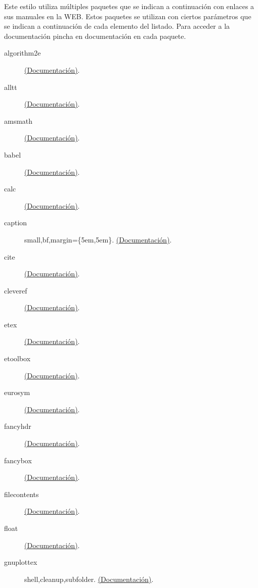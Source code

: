 Este estilo utiliza múltiples paquetes que se indican a continuación con enlaces a sus manuales en la WEB. Estos paquetes se utilizan con ciertos parámetros que se indican a continuación de cada elemento del listado. Para acceder a la documentación pincha en documentación en cada paquete.

\begin{description}
\item [algorithm2e] \href{http://osl.ugr.es/CTAN/macros/latex/contrib/algorithm2e/doc/algorithm2e.pdf}{(Documentación)}.
\item [alltt] \href{http://osl.ugr.es/CTAN/macros/latex/base/alltt.pdf}{(Documentación)}.
\item [amsmath] \href{http://osl.ugr.es/CTAN/macros/latex/required/amsmath/amsmath.pdf}{(Documentación)}.
\item [babel] \href{http://osl.ugr.es/CTAN/macros/latex/required/babel/base/babel.pdf}{(Documentación)}.
\item [calc] \href{http://osl.ugr.es/CTAN/macros/latex/required/tools/calc.pdf}{(Documentación)}.
\item [caption] small,bf,margin=\{5em,5em\}. \href{http://osl.ugr.es/CTAN/macros/latex/contrib/caption/caption-eng.pdf}{(Documentación)}.
\item [cite] \href{http://osl.ugr.es/CTAN/macros/latex/contrib/cite/cite.pdf}{(Documentación)}.
\item [cleveref] \href{http://osl.ugr.es/CTAN/macros/latex/contrib/cleveref/cleveref.pdf}{(Documentación)}.
\item [etex] \href{http://osl.ugr.es/CTAN/systems/doc/etex/etex_man.pdf}{(Documentación)}.
\item [etoolbox] \href{http://osl.ugr.es/CTAN/macros/latex/contrib/etoolbox/etoolbox.pdf}{(Documentación)}.
\item [eurosym] \href{ftp://ftp.dante.de/tex-archive/fonts/eurosym/doc/testeuro.pdf}{(Documentación)}.
\item [fancyhdr] \href{http://osl.ugr.es/CTAN/macros/latex/contrib/fancyhdr/fancyhdr.pdf}{(Documentación)}.
\item [fancybox] \href{http://osl.ugr.es/CTAN/macros/latex/contrib/fancybox/fancybox-doc.pdf}{(Documentación)}.
\item [filecontents] \href{http://osl.ugr.es/CTAN/macros/latex/contrib/filecontents/filecontents.pdf}{(Documentación)}.
\item [float] \href{http://osl.ugr.es/CTAN/macros/latex/contrib/float/float.pdf}{(Documentación)}.
\item [gnuplottex] shell,cleanup,subfolder. \href{http://osl.ugr.es/CTAN/macros/latex/contrib/gnuplottex/gnuplottex.pdf}{(Documentación)}.

\end{description}
